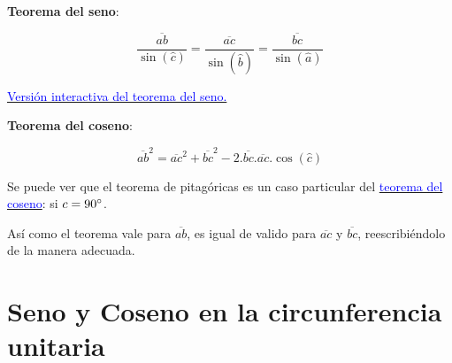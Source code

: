 \documentclass[a4paper,11pt,spanish,sans]{exam}
\begin{document}
\begin{minipage}{0.5\linewidth}


\end{minipage}
\begin{minipage}{0.5\linewidth}
\textbf{Teorema del seno}:

\[
\frac{\overline{ab}}{\sin(\hat{c})}=\frac{\overline{ac}}{\sin(\hat{b})}=\frac{\overline{bc}}{\sin(\hat{a})}
\]

\href{http://tube.geogebra.org/material/simple/id/55239}{\textcolor{blue}{Versión interactiva del teorema del seno.}}

\textbf{Teorema del coseno}:

\[
\overline{ab}^2=\overline{ac}^2 + \overline{bc}^2 - 2.\overline{bc}.\overline{ac}.\cos(\hat{c})
\]

Se puede ver que el teorema de pitagóricas es un caso particular del \href{http://tube.geogebra.org/material/simple/id/3498}{\textcolor{blue}{teorema del coseno}}: si  $c=90 \degree$.

Así como el teorema vale para $\overline{ab}$, es igual de valido para $\overline{ac}$ y $\overline{bc}$, reescribiéndolo de la manera adecuada. 

\end{minipage}

\section*{Seno y Coseno en la circunferencia unitaria}
\end{document}
